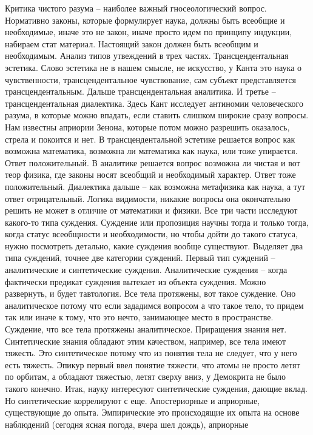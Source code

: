 \documentclass[a4paper, 12pt]{article}
\begin{document}
Критика чистого разума -- наиболее важный гносеологический вопрос. 
Нормативно законы, которые формулирует наука, должны быть всеобщие 
и необходимые, иначе это не закон, иначе просто идем по принципу 
индукции, набираем стат материал. Настоящий закон должен быть всеобщим 
и необходимым. Анализ типов утвеждений в трех частях. Трансцендентальная 
эстетика. Слово эстетика не в нашем смысле, не искусство, у Канта это 
наука о чувственности, трансцендентальное чувствование, сам субъект 
представляется трансцендентальным. Дальше трансцендентальная аналитика. 
И третье -- трансцендентальная диалектика. Здесь Кант исследует 
антиномии человеческого разума, в которые можно впадать, если ставить 
слишком широкие сразу вопросы. Нам известны априории Зенона, которые 
потом можно разрешить оказалось, стрела и покоится и нет. 
В трансцендентальной эстетике решается вопрос как возможна математика, 
возможна ли математика как наука, или тоже упирается. Ответ 
положительный. В аналитике решается вопрос возможна ли чистая и вот теор 
физика, где законы носят всеобщий и необходимый характер. Ответ тоже 
положительный. Диалектика дальше -- как возможна метафизика как наука, 
а тут ответ отрицательный. Логика видимости, никакие вопросы она 
окончательно решить не может в отличие от математики и физики. Все три 
части исследуют какого-то типа суждения. Суждение или пропозиция научны 
тогда и только тогда, когда статус всеобщности и необходимости, но чтобы 
дойти до такого статуса, нужно посмотреть детально, какие суждения 
вообще существуют. Выделяет два типа суждений, точнее две категории 
суждений. Первый тип суждений -- аналитические и синтетические суждения. 
Аналитические суждения -- когда фактически предикат суждения вытекает из 
объекта суждения. Можно развернуть, и будет тавтология. Все тела 
протяжены, вот такое суждение. Оно аналитическое потому что если 
зададимся вопросом а что такое тело, то придем так или иначе к тому, что 
это нечто, занимающее место в пространстве. Суждение, что все тела 
протяжены аналитическое. Приращения знания нет. Синтетические знания 
обладают этим качеством, например, все тела имеют тяжесть. Это 
синтетическое потому что из понятия тела не следует, что у него есть 
тяжесть. Эпикур первый ввел понятие тяжести, что атомы не просто летят 
по орбитам, а обладают тяжестью, летят сверху вниз, у Демокрита не было 
такого конечно. Итак, науку интересуют синтетические суждения, дающие 
вклад. Но синтетические коррелируют с еще. Апостериорные и априорные, 
существующие до опыта. Эмпирические это происходящие их опыта на основе 
наблюдений (сегодня ясная погода, вчера шел дождь), априорные 
\end{document}
